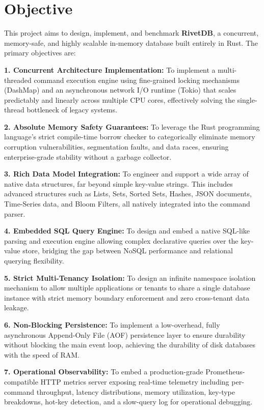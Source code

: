 \section{Objective}
This project aims to design, implement, and benchmark \textbf{RivetDB}, a concurrent, memory-safe, and highly scalable in-memory database built entirely in Rust. The primary objectives are:

\textbf{1. Concurrent Architecture Implementation:} To implement a multi-threaded command execution engine using fine-grained locking mechanisms (DashMap) and an asynchronous network I/O runtime (Tokio) that scales predictably and linearly across multiple CPU cores, effectively solving the single-thread bottleneck of legacy systems.

\textbf{2. Absolute Memory Safety Guarantees:} To leverage the Rust programming language's strict compile-time borrow checker to categorically eliminate memory corruption vulnerabilities, segmentation faults, and data races, ensuring enterprise-grade stability without a garbage collector.

\textbf{3. Rich Data Model Integration:} To engineer and support a wide array of native data structures, far beyond simple key-value strings. This includes advanced structures such as Lists, Sets, Sorted Sets, Hashes, JSON documents, Time-Series data, and Bloom Filters, all natively integrated into the command parser.

\textbf{4. Embedded SQL Query Engine:} To design and embed a native SQL-like parsing and execution engine allowing complex declarative queries over the key-value store, bridging the gap between NoSQL performance and relational querying flexibility.

\textbf{5. Strict Multi-Tenancy Isolation:} To design an infinite namespace isolation mechanism to allow multiple applications or tenants to share a single database instance with strict memory boundary enforcement and zero cross-tenant data leakage.

\textbf{6. Non-Blocking Persistence:} To implement a low-overhead, fully asynchronous Append-Only File (AOF) persistence layer to ensure durability without blocking the main event loop, achieving the durability of disk databases with the speed of RAM.

\textbf{7. Operational Observability:} To embed a production-grade Prometheus-compatible HTTP metrics server exposing real-time telemetry including per-command throughput, latency distributions, memory utilization, key-type breakdowns, hot-key detection, and a slow-query log for operational debugging.

